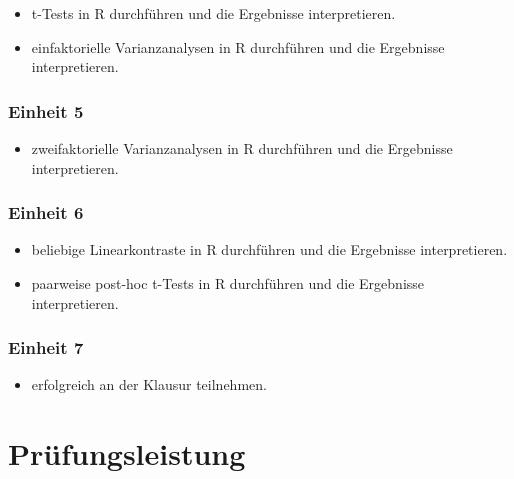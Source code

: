 \documentclass[
]{book}
\providecommand{\tightlist}{%
  \setlength{\itemsep}{0pt}\setlength{\parskip}{0pt}}
\begin{document}
\begin{itemize}
\tightlist
\item
  t-Tests in R durchführen und die Ergebnisse interpretieren.
\item
  einfaktorielle Varianzanalysen in R durchführen und die Ergebnisse interpretieren.
\end{itemize}

\hypertarget{einheit-5}{%
\subsubsection*{Einheit 5}\label{einheit-5}}

\begin{itemize}
\tightlist
\item
  zweifaktorielle Varianzanalysen in R durchführen und die Ergebnisse interpretieren.
\end{itemize}

\hypertarget{einheit-6}{%
\subsubsection*{Einheit 6}\label{einheit-6}}

\begin{itemize}
\tightlist
\item
  beliebige Linearkontraste in R durchführen und die Ergebnisse interpretieren.
\item
  paarweise post-hoc t-Tests in R durchführen und die Ergebnisse interpretieren.
\end{itemize}

\hypertarget{einheit-7}{%
\subsubsection*{Einheit 7}\label{einheit-7}}

\begin{itemize}
\tightlist
\item
  erfolgreich an der Klausur teilnehmen.
\end{itemize}

\hypertarget{pruxfcfungsleistung}{%
\section{Prüfungsleistung}\label{pruxfcfungsleistung}}
\end{document}
